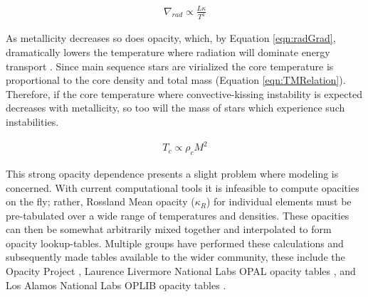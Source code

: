 \begin{align}\label{eqn:radGrad}
	\nabla_{rad} \propto \frac{L\kappa}{T^{4}}
\end{align}

As metallicity decreases so does opacity, which, by Equation \ref{eqn:radGrad},
dramatically lowers the temperature where radiation will dominate energy transport
\citep{Chabrier1997}. Since main sequence stars are virialized the core
temperature is proportional to the core density and total mass (Equation
\ref{eqn:TMRelation}). Therefore, if the core temperature where
convective-kissing instability is expected decreases with metallicity, so too
will the mass of stars which experience such instabilities.

\begin{align}\label{eqn:TMRelation}
	T_{c} \propto \rho_{c}M^{2}
\end{align}

This strong opacity dependence presents a slight problem where modeling is 
concerned. With current computational tools it is infeasible to compute opacities on the
fly; rather, Rossland Mean opacity ($\kappa_{R}$) for individual elements must
be pre-tabulated over a wide range of temperatures and densities. These
opacities can then be somewhat arbitrarily mixed together and interpolated to
form opacity lookup-tables. Multiple groups have performed these calculations
and subsequently made tables available to the wider community, these include
the Opacity Project \citep[OP][]{Seaton1994}, Laurence Livermore National Labs
OPAL opacity tables \citep{Iglesias1996}, and Los Alamos National Labs OPLIB
opacity tables \citep{Colgan2016}.

